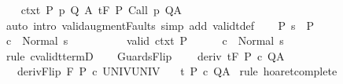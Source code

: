\begin{isabellebody}
\ \ \isamarkupfalse%
\ ctxt{\isacharprime}{\isacharcolon}\ {\isachardoublequoteopen}{\isasymforall}{\isacharparenleft}P{\isacharcomma}\ p{\isacharcomma}\ Q{\isacharcomma}\ A{\isacharparenright}{\isasymin}{\isasymTheta}{\isachardot}\ {\isasymGamma}{\isasymTurnstile}\isactrlsub t\isactrlbsub {\isacharslash}F\isactrlesub \ P\ {\isacharparenleft}Call\ p{\isacharparenright}\ Q{\isacharcomma}A{\isachardoublequoteclose}\ \isanewline
\ \ \ \ \isamarkupfalse%
\ {\isacharparenleft}auto\ intro{\isacharcolon}\ valid{\isacharunderscore}augment{\isacharunderscore}Faults\ simp\ add{\isacharcolon}\ validt{\isacharunderscore}def{\isacharparenright}\isanewline
\ \ \isamarkupfalse%
\ P{\isacharcolon}\ {\isachardoublequoteopen}s\ {\isasymin}\ P{\isachardoublequoteclose}\isanewline
\ \ \isamarkupfalse%
\ {\isachardoublequoteopen}{\isasymGamma}{\isasymturnstile}c\ {\isasymdown}\ Normal\ s{\isachardoublequoteclose}\isanewline
\ \ \isamarkupfalse%
\ {\isacharminus}\isanewline
\ \ \ \ \isamarkupfalse%
\ valid\ ctxt{\isacharprime}\ P\isanewline
\ \ \ \ \isamarkupfalse%
\ {\isachardoublequoteopen}{\isasymGamma}{\isasymturnstile}c\ {\isasymdown}\ Normal\ s{\isachardoublequoteclose}\isanewline
\ \ \ \ \ \ \isamarkupfalse%
\ {\isacharparenleft}rule\ cvalidt{\isacharunderscore}termD{\isacharparenright}\isanewline
\ \ \isamarkupfalse%
\isanewline
{}\isamarkupfalse%
%
\endisatagproof
{\isafoldproof}%
%
\isadelimproof
\isanewline
%
\endisadelimproof
\isanewline
\isanewline
{}\isamarkupfalse%
\ GuardsFlip{\isacharcolon}\ \isanewline
\ \ \ deriv{\isacharcolon}\ {\isachardoublequoteopen}{\isasymGamma}{\isacharcomma}{\isasymTheta}{\isasymturnstile}\isactrlsub t\isactrlbsub {\isacharslash}F\isactrlesub \ P\ c\ Q{\isacharcomma}A{\isachardoublequoteclose}\isanewline
\ \ \ derivFlip{\isacharcolon}\ {\isachardoublequoteopen}{\isasymGamma}{\isacharcomma}{\isasymTheta}{\isasymturnstile}\isactrlbsub {\isacharslash}{\isacharminus}F\isactrlesub \ P\ c\ UNIV{\isacharcomma}UNIV{\isachardoublequoteclose}\isanewline
\ \ \ {\isachardoublequoteopen}{\isasymGamma}{\isacharcomma}{\isasymTheta}{\isasymturnstile}\isactrlsub t\isactrlbsub {\isacharslash}{\isacharbraceleft}{\isacharbraceright}\isactrlesub \ P\ c\ Q{\isacharcomma}A{\isachardoublequoteclose}\isanewline
%
\isadelimproof
%
\endisadelimproof
%
\isatagproof
{}\isamarkupfalse%
\ {\isacharparenleft}rule\ hoaret{\isacharunderscore}complete{\isacharprime}{\isacharparenright}\isanewline

\end{isabellebody}
